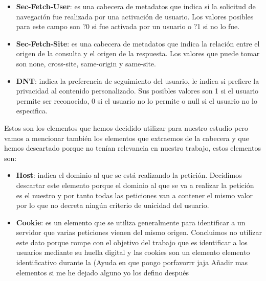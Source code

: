 \begin{itemize}
    \item \textbf{Sec-Fetch-User}: es una cabecera de metadatos que indica si la solicitud de navegación fue realizada por una activación de usuario. Los valores posibles para este campo son ?0 si fue activada por un usuario o ?1 si no lo fue.
    \item \textbf{Sec-Fetch-Site}: es una cabecera de metadatos que indica la relación entre el origen de la consulta y el origen de la respuesta. Los valores que puede tomar son none, cross-site, same-origin y same-site.
    \item \textbf{DNT}: indica la preferencia de seguimiento del usuario, le indica si prefiere la privacidad al contenido personalizado. Sus posibles valores son 1 si el usuario permite ser reconocido, 0 si el usuario no lo permite o null si el usuario no lo especifica.
\end{itemize}
Estos son los elementos que hemos decidido utilizar para nuestro estudio pero vamos a mencionar también los elementos que extraemos de la cabecera y que hemos descartado porque no tenían relevancia en nuestro trabajo, estos elementos son:
\begin{itemize}
    \item \textbf{Host}: indica el dominio al que se está realizando la petición. Decidimos descartar este elemento porque el dominio al que se va a realizar la petición es el nuestro y por tanto todas las peticiones van a contener el mismo valor por lo que no decreta ningún criterio de unicidad del usuario.
    \item \textbf{Cookie}: es un elemento que se utiliza generalmente para identificar a un servidor que varias peticiones vienen del mismo origen. Concluimos no utilizar este dato porque rompe con el objetivo del trabajo que es identificar a los usuarios mediante su huella digital y las cookies son un elemento elemento identificativo durante la (Ayuda en que pongo porfavorrr jaja
    Añadir mas elementos si me he dejado alguno yo los defino después
\end{itemize}

